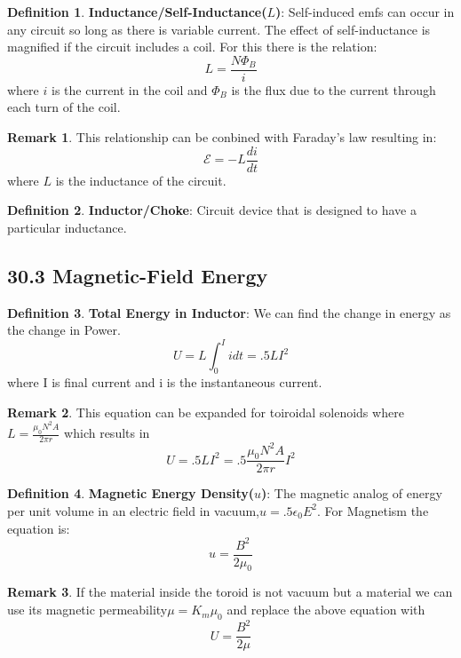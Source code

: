 \documentclass[12pt]{amsart}
\theoremstyle{definition}
\newtheorem{definition}{Definition} %
\newtheorem*{remark}{Remark}        %
\numberwithin{equation}{theorem}    %
\begin{document}
\begin{definition}
    \textbf{Inductance/Self-Inductance($L$)}:
    Self-induced emfs can occur in any circuit so long as there is variable current. The effect of self-inductance is magnified if the circuit includes a coil. For this there is the relation:
    $$L = \frac{N\Phi_B}{i}$$ where $i$ is the current in the coil and $\Phi_B$ is the flux due to the current through each turn of the coil.
    \begin{remark}
        This relationship can be conbined with Faraday's law resulting in:
        $$\mathcal{E} = -L\frac{di}{dt}$$ where $L$ is the inductance of the circuit.
    \end{remark}
\end{definition}

\begin{definition}
    \textbf{Inductor/Choke}:
    Circuit device that is designed to have a particular inductance.
\end{definition}

\subsection*{30.3 Magnetic-Field Energy}

\begin{definition}
    \textbf{Total Energy in Inductor}:
    We can find the change in energy as the change in Power.
    $$U = L\int^I_0idt = .5LI^2$$ where I is final current and i is the instantaneous current.
    \begin{remark}
        This equation can be expanded for toiroidal solenoids where $L = \frac{\mu_0N^2A}{2\pi r}$ which results in $$U = .5LI^2 = .5\frac{\mu_0N^2A}{2\pi r}I^2$$
    \end{remark}
\end{definition}

\begin{definition}
    \textbf{Magnetic Energy Density($u$)}:
    The magnetic analog of energy per unit volume in an electric field in vacuum,$u=.5\epsilon_0E^2$. For Magnetism the equation is: 
    $$u = \frac{B^2}{2\mu_0}$$
    \begin{remark}
        If the material inside the toroid is not vacuum but a material we can use its magnetic permeability$\mu = K_m\mu_0$ and replace the above equation with $$U = \frac{B^2}{2\mu}$$
    \end{remark} 
\end{definition}
\end{document}
